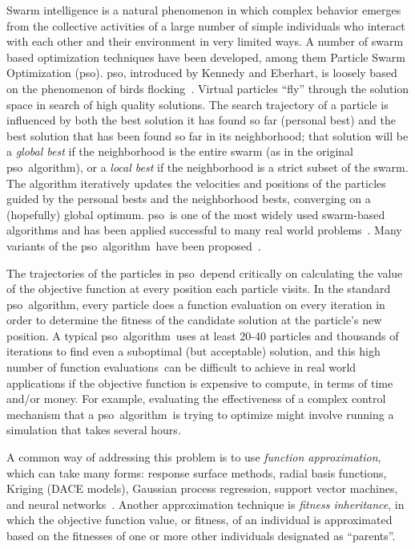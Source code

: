 \documentclass[a4paper,twoside]{article}
\newcommand{\fes}{function evaluations}
\newcommand{\pso}{{\sc pso}}
\newcommand{\alg}{algorithm}
\begin{document}
Swarm intelligence is a natural phenomenon in which complex behavior emerges from the collective activities of a large number of simple individuals who interact with each other and their environment in very limited ways. A number of swarm  based optimization techniques have been developed, among them Particle Swarm Optimization (\pso).  \pso, introduced by Kennedy and Eberhart, is loosely based on the phenomenon of birds flocking~\cite{kennedy95}. Virtual particles ``fly'' through the solution space in search of high quality solutions. The search trajectory of a particle is influenced by both the best solution it has found so far (personal best) and the best solution that has been found so far in its neighborhood; that solution will be a \emph{global best} if the neighborhood is the entire swarm (as in the original \pso\ \alg), or a \emph{local best} if the neighborhood is a strict subset of the swarm. The algorithm iteratively updates the velocities and positions of the particles guided by the personal bests and the neighborhood bests, converging on a (hopefully) global optimum. \pso\ is one of the most widely used swarm-based algorithms and has been applied successful to many real world problems~\cite{poli07}. 
Many variants of the \pso\ \alg\ have been proposed~\cite{sedighizadeh09}.

The trajectories of the particles in \pso\ depend critically on calculating the value of the objective function at every position each particle visits.  In the standard \pso\ \alg, every particle does a function evaluation on every iteration in order to determine the fitness of the candidate solution at the particle's new position. A typical \pso\ \alg\ uses at least 20-40 particles and thousands of iterations to find even a suboptimal (but acceptable) solution, and this high number of \fes\ can be difficult to achieve in real world applications if the objective function is expensive to compute, in terms of time and/or money.  For example, evaluating the effectiveness of a complex control mechanism that a \pso\ \alg\ is trying to optimize might involve running a simulation that takes several hours.  

A common way of addressing this problem is to use \emph{function approximation}, which can take many forms: response surface methods, radial basis functions, Kriging (DACE models), Gaussian process regression, support vector machines, and neural networks~\cite{santana-quintero08}.  Another approximation technique is \emph{fitness inheritance}, in which the objective function value, or fitness, of an individual is approximated based on the fitnesses of one or more other individuals designated as ``parents''\cite{reyes-sierra07}.
\end{document}
